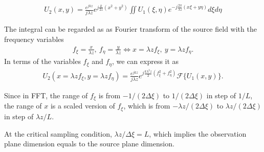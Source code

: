 \documentclass{revtex4-2}
\begin{document}
\begin{align}
    U_2(x, y) = \frac{e^{jkz}}{j\lambda z} e^{j\frac{k}{2z}(x^2+y^2)} 
    \iint U_1(\xi,\eta) e^{-j\frac{2\pi}{\lambda z}(x\xi + y\eta)}d\xi d\eta
\end{align}

The integral can be regarded as as Fourier transform of the source field with the frequency variables
\begin{align}
    f_\xi = \frac{x}{\lambda z}, \ f_\eta = \frac{y}{\lambda z} \iff
    x = \lambda z f_\xi, \ y = \lambda z f_\eta.
\end{align}
In terms of the variables $f_\xi$ and $f_\eta$, we can express it as
\begin{align}
    \boxed{ U_2(x=\lambda zf_\xi, y=\lambda zf_\eta) = 
    \frac{e^{jkz}}{j\lambda z} e^{j\frac{k\lambda^2z}{2}(f_\xi^2+f_\eta^2)}
    \mathcal{F}\{U_1(x, y)\}. }
\end{align}

Since in FFT, the range of $f_\xi$ is from $-1/(2\Delta\xi)$ to $1/(2\Delta\xi)$ in step of $1/L$,
the range of $x$ is a scaled version of $f_\xi$, which is from $-\lambda z / (2\Delta\xi)$ to 
$\lambda z / (2\Delta \xi)$ in step of $\lambda z/L$.

At the critical sampling condition, $\lambda z/\Delta \xi = L$, which implies the observation plane
dimension equals to the source plane dimension.
\end{document}
